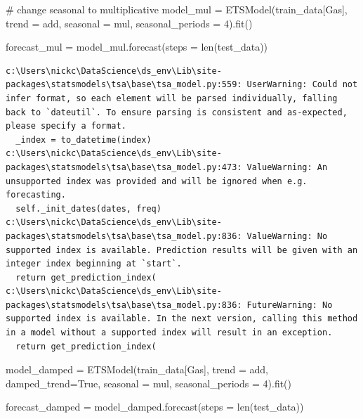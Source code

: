 \documentclass[
  11pt,
]{article}
\newenvironment{Shaded}{\begin{snugshade}}{\end{snugshade}}
\newcommand{\BuiltInTok}[1]{\textcolor[rgb]{0.00,0.23,0.31}{#1}}
\newcommand{\CommentTok}[1]{\textcolor[rgb]{0.37,0.37,0.37}{#1}}
\newcommand{\DecValTok}[1]{\textcolor[rgb]{0.68,0.00,0.00}{#1}}
\newcommand{\NormalTok}[1]{\textcolor[rgb]{0.00,0.23,0.31}{#1}}
\newcommand{\OperatorTok}[1]{\textcolor[rgb]{0.37,0.37,0.37}{#1}}
\newcommand{\StringTok}[1]{\textcolor[rgb]{0.13,0.47,0.30}{#1}}
\newcommand{\VariableTok}[1]{\textcolor[rgb]{0.07,0.07,0.07}{#1}}
\begin{document}
\begin{Shaded}
\begin{Highlighting}[]
\CommentTok{\#  change seasonal to multiplicative}
\NormalTok{model\_mul }\OperatorTok{=}\NormalTok{ ETSModel(train\_data[}\StringTok{\textquotesingle{}Gas\textquotesingle{}}\NormalTok{], trend }\OperatorTok{=} \StringTok{\textquotesingle{}add\textquotesingle{}}\NormalTok{, seasonal }\OperatorTok{=} \StringTok{\textquotesingle{}mul\textquotesingle{}}\NormalTok{, seasonal\_periods }\OperatorTok{=} \DecValTok{4}\NormalTok{).fit()}

\NormalTok{forecast\_mul }\OperatorTok{=}\NormalTok{ model\_mul.forecast(steps }\OperatorTok{=} \BuiltInTok{len}\NormalTok{(test\_data))}
\end{Highlighting}
\end{Shaded}

\begin{verbatim}
c:\Users\nickc\DataScience\ds_env\Lib\site-packages\statsmodels\tsa\base\tsa_model.py:559: UserWarning: Could not infer format, so each element will be parsed individually, falling back to `dateutil`. To ensure parsing is consistent and as-expected, please specify a format.
  _index = to_datetime(index)
c:\Users\nickc\DataScience\ds_env\Lib\site-packages\statsmodels\tsa\base\tsa_model.py:473: ValueWarning: An unsupported index was provided and will be ignored when e.g. forecasting.
  self._init_dates(dates, freq)
c:\Users\nickc\DataScience\ds_env\Lib\site-packages\statsmodels\tsa\base\tsa_model.py:836: ValueWarning: No supported index is available. Prediction results will be given with an integer index beginning at `start`.
  return get_prediction_index(
c:\Users\nickc\DataScience\ds_env\Lib\site-packages\statsmodels\tsa\base\tsa_model.py:836: FutureWarning: No supported index is available. In the next version, calling this method in a model without a supported index will result in an exception.
  return get_prediction_index(
\end{verbatim}

\begin{Shaded}
\begin{Highlighting}[]
\NormalTok{model\_damped }\OperatorTok{=}\NormalTok{ ETSModel(train\_data[}\StringTok{\textquotesingle{}Gas\textquotesingle{}}\NormalTok{], trend }\OperatorTok{=} \StringTok{\textquotesingle{}add\textquotesingle{}}\NormalTok{, damped\_trend}\OperatorTok{=}\VariableTok{True}\NormalTok{, seasonal }\OperatorTok{=} \StringTok{\textquotesingle{}mul\textquotesingle{}}\NormalTok{, seasonal\_periods }\OperatorTok{=} \DecValTok{4}\NormalTok{).fit()}

\NormalTok{forecast\_damped }\OperatorTok{=}\NormalTok{ model\_damped.forecast(steps }\OperatorTok{=} \BuiltInTok{len}\NormalTok{(test\_data))}
\end{Highlighting}
\end{Shaded}
\end{document}
